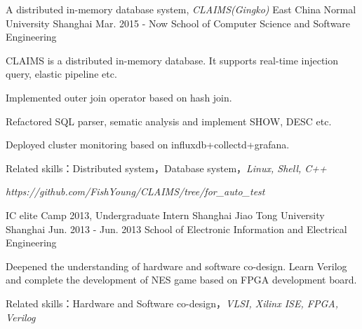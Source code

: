\begin{cventries}
  \cventry
    {A distributed in-memory database system, \it{CLAIMS(Gingko)} }
    {East China Normal University}
    {Shanghai}
    {Mar. 2015 - Now}
    {School of Computer Science and Software Engineering}
    {
      \begin{cvitems}
	\item {CLAIMS is a distributed in-memory database. It supports real-time injection query, elastic pipeline etc.}
	\item {Implemented outer join operator based on hash join.}
	\item {Refactored SQL parser, sematic analysis and implement SHOW, DESC etc.}
	\item {Deployed cluster monitoring based on influxdb+collectd+grafana.}
	\item {Related skills：Distributed system，Database system，\it{Linux, Shell, C++}}
	\item[] {\color{red} \emph {https://github.com/FishYoung/CLAIMS/tree/for\_auto\_test}}
      \end{cvitems}
    }
  \cventry
    {IC elite Camp 2013, Undergraduate Intern }
    {Shanghai Jiao Tong University}
    {Shanghai}
    {Jun. 2013 - Jun. 2013}
    {School of Electronic Information and Electrical Engineering}
    {
      \begin{cvitems}
        \item {Deepened the understanding of hardware and software co-design. Learn Verilog and complete the development of NES game based on FPGA development board.}
        \item {Related skills：Hardware and Software co-design，\it{VLSI, Xilinx ISE, FPGA, Verilog}}
      \end{cvitems}
    }
\end{cventries}
